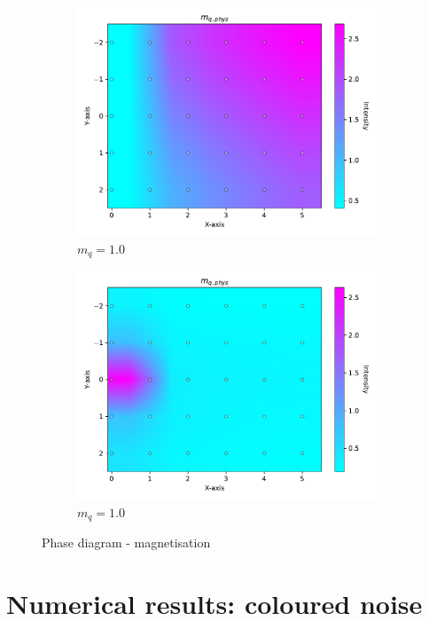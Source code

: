 \begin{figure}
    \begin{subfigure}[b]{0.3\textwidth}
        \includegraphics[width=\textwidth]{figures/phase_diagram/m_g_mq.pdf}
        \caption{$m_q = 1.0$}
    \end{subfigure}
    \begin{subfigure}[b]{0.3\textwidth}
        \includegraphics[width=\textwidth]{figures/phase_diagram/m_g_chi2.pdf}
        \caption{$m_q = 1.0$}
    \end{subfigure}
    \caption{Phase diagram - magnetisation}
    \label{fig:phase_diagram_phi}
\end{figure}

\chapter{Numerical results: coloured noise}
\label{chapt:results_coloured}

